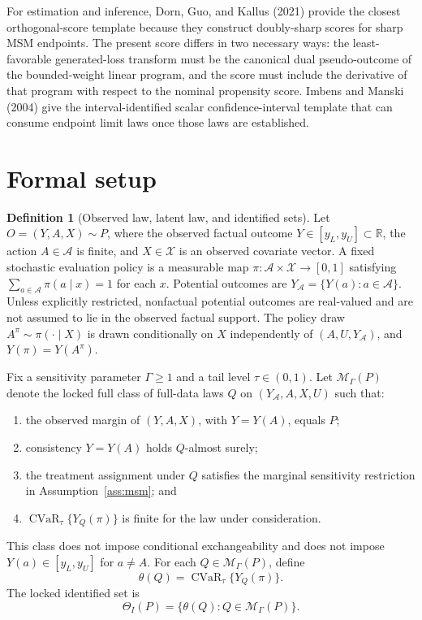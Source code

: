 \documentclass[11pt]{article}
\newcommand{\R}{\mathbb{R}}
\theoremstyle{definition}
\newtheorem{definition}{Definition}
\theoremstyle{plain}
\theoremstyle{remark}
\begin{document}
For estimation and inference, Dorn, Guo, and Kallus (2021) provide the closest
orthogonal-score template because they construct doubly-sharp scores for sharp
MSM endpoints.  The present score differs in two necessary ways: the
least-favorable generated-loss transform must be the canonical dual
pseudo-outcome of the bounded-weight linear program, and the score must include
the derivative of that program with respect to the nominal propensity score.
Imbens and Manski (2004) give the interval-identified scalar confidence-interval
template that can consume endpoint limit laws once those laws are established.

\section{Formal setup}
\begin{definition}[Observed law, latent law, and identified sets]
Let \(O=(Y,A,X)\sim P\), where the observed factual outcome
\(Y\in[y_L,y_U]\subset\R\), the action \(A\in\mathcal A\) is finite, and
\(X\in\mathcal X\) is an observed covariate vector.  A fixed stochastic
evaluation policy is a measurable map
\(\pi:\mathcal A\times\mathcal X\to[0,1]\) satisfying
\(\sum_{a\in\mathcal A}\pi(a\mid x)=1\) for each \(x\).  Potential outcomes are
\(Y_{\mathcal A}=\{Y(a):a\in\mathcal A\}\).  Unless explicitly restricted,
nonfactual potential outcomes are real-valued and are not assumed to lie in the
observed factual support.  The policy draw \(A^\pi\sim\pi(\cdot\mid X)\) is
drawn conditionally on \(X\) independently of \((A,U,Y_{\mathcal A})\), and
\(Y(\pi)=Y(A^\pi)\).

Fix a sensitivity parameter \(\Gamma\geq 1\) and a tail level \(\tau\in(0,1)\).
Let \(\mathcal M_\Gamma(P)\) denote the locked full class of full-data laws
\(Q\) on \((Y_{\mathcal A},A,X,U)\) such that:
\begin{enumerate}[label=(\roman*),leftmargin=2em]
\item the observed margin of \((Y,A,X)\), with \(Y=Y(A)\), equals \(P\);
\item consistency \(Y=Y(A)\) holds \(Q\)-almost surely;
\item the treatment assignment under \(Q\) satisfies the marginal sensitivity
  restriction in Assumption~\ref{ass:msm}; and
\item \(\operatorname{CVaR}_\tau\{Y_Q(\pi)\}\) is finite for the law under
  consideration.
\end{enumerate}
This class does not impose conditional exchangeability and does not impose
\(Y(a)\in[y_L,y_U]\) for \(a\ne A\).  For each \(Q\in\mathcal M_\Gamma(P)\),
define
\[
\theta(Q)=\operatorname{CVaR}_{\tau}\{Y_Q(\pi)\}.
\]
The locked identified set is
\[
\Theta_I(P)=\{\theta(Q):Q\in\mathcal M_\Gamma(P)\}.
\]


\end{definition}
\end{document}
